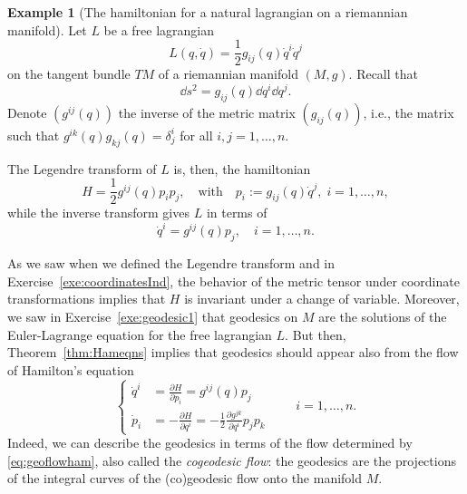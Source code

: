 \documentclass[english,fontsize=11pt,paper=b5]{scrbook}
\theoremstyle{definition}
\newtheorem{example}{Example}[chapter]
\begin{document}
    \begin{example}[The hamiltonian for a natural lagrangian on a riemannian manifold]\label{ex:nlrm}
      Let $L$ be a free lagrangian
      \begin{equation}
        L(q, \dot q) = \frac12 g_{ij}(q) \dot q^i \dot q^j
      \end{equation}
      on the tangent bundle $TM$ of a riemannian manifold $(M,g)$.
      Recall that
      \begin{equation}
        \dd s^2 = g_{ij}(q)\dd q^i \dd q^j.
      \end{equation}
      Denote $(g^{ij}(q))$ the inverse of the metric matrix $(g_{ij}(q))$, i.e., the matrix such that $g^{ik}(q)g_{kj}(q) = \delta^i_j$ for all $i,j=1,\ldots,n$.

      The Legendre transform of $L$ is, then, the hamiltonian
      \begin{equation}
        H = \frac12 g^{ij}(q) p_i p_j,\quad\mbox{with}\quad
        p_i := g_{ij}(q)\dot q^j, \; i = 1,\ldots, n,
      \end{equation}
      while the inverse transform gives $L$ in terms of
      \begin{equation}
        \dot q^i = g^{ij}(q) p_j, \quad i = 1,\ldots, n.
      \end{equation}

      As we saw when we defined the Legendre transform and in Exercise~\ref{exe:coordinatesInd}, the behavior of the metric tensor under coordinate transformations implies that $H$ is invariant under a change of variable.
      Moreover, we saw in Exercise~\ref{exe:geodesic1} that geodesics on $M$ are the solutions of the Euler-Lagrange equation for the free lagrangian $L$.
      But then, Theorem~\ref{thm:Hameqns} implies that geodesics should appear also from the flow of Hamilton's equation
      \begin{equation}\label{eq:geoflowham}
        \left\lbrace
          \begin{aligned}
            \dot q^i & = \frac{\partial H}{\partial p_i} = g^{ij}(q) p_j                                          \\
            \dot p_i & = -\frac{\partial H}{\partial q^i} = -\frac12 \frac{\partial g^{jk}}{\partial q^i} p_j p_k
          \end{aligned}
        \right.
        \qquad i=1,\ldots,n.
      \end{equation}
      Indeed, we can describe the geodesics in terms of the flow determined by \eqref{eq:geoflowham}, also called the \emph{cogeodesic flow}:
      the geodesics are the projections of the integral curves of the (co)geodesic flow onto the manifold $M$.


\end{example}
\end{document}
